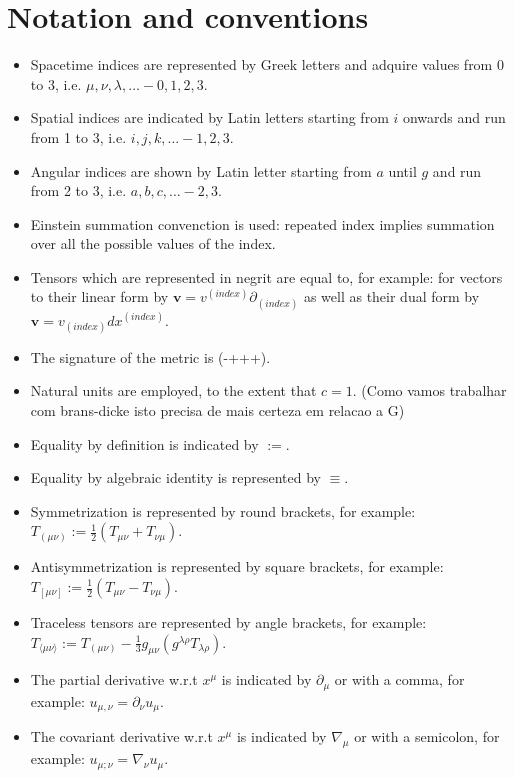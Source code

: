 \section{Notation and conventions}
\begin{itemize}
    \item Spacetime indices are represented by Greek letters and adquire values from 0 to 3, i.e. $\mu,\nu,\lambda,\ldots - 0,1,2,3$.
    \item Spatial indices are indicated by Latin letters starting from $i$ onwards and run from 1 to 3, i.e. $i,j,k,\ldots - 1,2,3$.
    \item Angular indices are shown by Latin letter starting from $a$ until $g$ and run from 2 to 3, i.e. $a,b,c,\ldots - 2,3$.
    \item Einstein summation convenction is used: repeated index implies summation over all the possible values of the index.
    \item Tensors which are represented in negrit are equal to, for example: for vectors to their linear form by $\mathbf{v}=v^{(index)}\partial_{(index)}$ as well as their dual form by $\mathbf{v}=v_{(index)}dx^{(index)}$.
    \item The signature of the metric is (-+++).
    \item Natural units are employed, to the extent that $c=1$. (Como vamos trabalhar com brans-dicke isto precisa de mais certeza em relacao a G)
    \item Equality by definition is indicated by $:=$.
    \item Equality by algebraic identity is represented by $\equiv$.
    \item Symmetrization is represented by round brackets, for example: $T_{(\mu\nu)}:=\frac{1}{2}(T_{\mu\nu}+T_{\nu\mu})$.
    \item Antisymmetrization is represented by square brackets, for example: $T_{[\mu\nu]}:=\frac{1}{2}(T_{\mu\nu}-T_{\nu\mu})$.
    \item Traceless tensors are represented by angle brackets, for example: $T_{\langle\mu\nu\rangle}:=T_{(\mu\nu)}-\frac{1}{3}g_{\mu\nu}(g^{\lambda\rho}T_{\lambda\rho})$.
    \item The partial derivative w.r.t $x^\mu$ is indicated by $\partial_\mu$ or with a comma, for example: $u_{\mu,\nu}=\partial_\nu u_\mu$.
    \item The covariant derivative w.r.t $x^\mu$ is indicated by $\nabla_\mu$ or with a semicolon, for example: $u_{\mu;\nu}=\nabla_\nu u_\mu$.
\end{itemize}